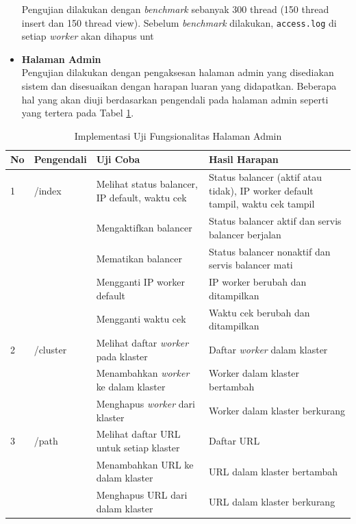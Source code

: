 \documentclass{ta-its}
\begin{document}
\begin{itemize}
					Pengujian dilakukan dengan \textit{benchmark} sebanyak 300 thread (150 thread insert dan 150 thread view). Sebelum \textit{benchmark} dilakukan, \texttt{access.log} di setiap \textit{worker} akan dihapus unt
					
					
					\item \textbf{Halaman Admin} \\
					Pengujian dilakukan dengan pengaksesan halaman admin yang disediakan sistem dan disesuaikan dengan harapan luaran yang didapatkan. Beberapa hal yang akan diuji berdasarkan pengendali pada halaman admin seperti yang tertera pada Tabel \ref{tabelUjiFungsionalitas}.
				\end{itemize}
				
				\begin{longtable}{|p{}|p{}|p{}|p{}|} %
					
					\caption{Implementasi Uji Fungsionalitas Halaman Admin} \label{tabelUjiFungsionalitas} \\
					\hline
					\textbf{No} & \textbf{Pengendali} & \textbf{Uji Coba} & \textbf{Hasil Harapan} \\ \hline
					
					\endhead
					\endfoot
					\endlastfoot
					
					
					1 & /index & Melihat status balancer, IP default, waktu cek & Status balancer (aktif atau tidak), IP worker default tampil, waktu cek tampil \\ \cline{3-4}
					&& Mengaktifkan	balancer & Status balancer aktif dan servis balancer berjalan \\ \cline{3-4}
					&& Mematikan balancer & Status balancer nonaktif dan servis balancer mati \\ \cline{3-4}
					&& Mengganti IP worker default & IP worker berubah dan ditampilkan \\ \cline{3-4}
					&& Mengganti waktu cek & Waktu cek berubah dan ditampilkan \\ \hline
					2 & /cluster & Melihat daftar \textit{worker} pada klaster & Daftar \textit{worker} dalam klaster \\ \cline{3-4}
					&& Menambahkan \textit{worker} ke dalam klaster & Worker dalam klaster bertambah \\ \cline{3-4}
					&& Menghapus \textit{worker} dari klaster & Worker dalam klaster berkurang \\ \hline
					3 & /path & Melihat daftar URL untuk setiap klaster & Daftar URL \\ \cline{3-4}
					&& Menambahkan URL ke dalam klaster & URL dalam klaster bertambah \\ \cline{3-4}
					&& Menghapus URL dari dalam klaster & URL dalam klaster berkurang \\ \hline
					
				\end{longtable}
			
\end{document}
